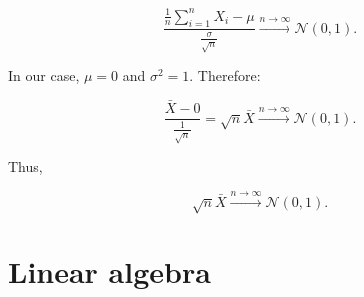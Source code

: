 \documentclass[letter]{article}
\theoremstyle{definition}
\newenvironment{soln}{
	\leavevmode\color{black}\ignorespaces
}{}
\begin{document}
\begin{enumerate}
\begin{soln}
               \[
               \frac{\frac{1}{n} \sum_{i=1}^n X_i - \mu}{\frac{\sigma}{\sqrt{n}}} \overset{n \rightarrow \infty}{\longrightarrow} \mathcal{N}(0, 1).
               \]
            
               In our case, \(\mu = 0\) and \(\sigma^2 = 1\). Therefore:
            
               \[
               \frac{\bar{X} - 0}{\frac{1}{\sqrt{n}}} = \sqrt{n} \bar{X} \overset{n \rightarrow \infty}{\longrightarrow} \mathcal{N}(0, 1).
               \]
            
               Thus,
            
               \[
               \sqrt{n} \bar{X} \overset{n \rightarrow \infty}{\longrightarrow} \mathcal{N}(0, 1).
               \]
            \end{soln}
		
	\end{enumerate}

 \pagebreak
	
	\section{Linear algebra}
	
	
\end{document}

